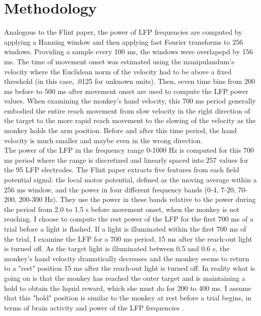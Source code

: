 \documentclass{article}
\begin{document}
\pagebreak
\section{Methodology}

\noindent
Analogous to the Flint paper\cite{flint}, the power of LFP frequencies are computed by applying a Hanning window and then applying fast Fourier transforms to 256 windows.  Providing a sample every 100 ms, the windows were overlapepd by 156 ms.  The time of movement onset was estimated using the manipulandum's velocity where the Euclidean norm of the velocity had to be above a fixed threshold (in this case, .0125 for unknown units).  Then, seven time bins from 200 ms before to 500 ms after movement onset are used to compute the LFP power values.  When examining the monkey's hand velocity, this 700 ms period generally embodied the entire reach movement from slow velocity in the right direction of the target to the more rapid reach movement to the slowing of the velocity as the monkey holds the arm position.  Before and after this time period, the hand velocity is much smaller and maybe even in the wrong direction. \\

\noindent
The power of the LFP in the frequency range 0-1000 Hz is computed for this 700 ms period where the range is discretized and linearly spaced into 257 values for the 95 LFP electrodes.  The Flint paper\cite{flint} extracts five features from each field potential signal:  the local motor potential, defined as the moving average within a 256 ms window, and the power in four different frequency bands (0-4, 7-20, 70-200, 200-300 Hz).  They use the power in these bands relative to the power during the period from 2.0 to 1.5 s before movement onset, when the monkey is not reaching.  I choose to compute the rest power of the LFP for the first 700 ms of a trial before a light is flashed.  If a light is illuminated within the first 700 ms of the trial, I examine the LFP for a 700 ms period, 15 ms after the reach-out light is turned off.  As the target light is illuminated between 0.5 and 0.6 s, the monkey's hand velocity dramatically decreases and the monkey seems to return to a "rest" position 15 ms after the reach-out light is turned off.  In reality what is going on is that the monkey has reached the outer target and is maintaining a hold to obtain the liquid reward, which she must do for 200 to 400 ms.  I assume that this "hold" position is similar to the monkey at rest before a trial begins, in terms of brain activity and power of the LFP frequencies . \\
\end{document}
